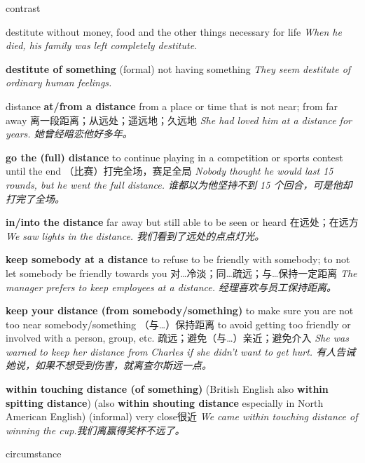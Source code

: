 \begin{DefWord}{contrast}
\end{DefWord}

\begin{DefWord}{destitute}
    without money, food and the other things necessary for life
    \textit{When he died, his family was left completely destitute.}

    \textbf{destitute of something} (formal) not having something
    \textit{They seem destitute of ordinary human feelings.}
\end{DefWord}

\begin{DefWord}{distance}
\textbf{at/from a distance}
from a place or time that is not near; from far away 离一段距离；从远处；遥远地；久远地
\textit{She had loved him at a distance for years. 她曾经暗恋他好多年。}

\textbf{go the (full) distance}
to continue playing in a competition or sports contest until the end （比赛）打完全场，赛足全局
\textit{Nobody thought he would last 15 rounds, but he went the full distance. 谁都以为他坚持不到 15 个回合，可是他却打完了全场。}

\textbf{in/into the distance}
far away but still able to be seen or heard 在远处；在远方
\textit{We saw lights in the distance. 我们看到了远处的点点灯光。}

\textbf{keep somebody at a distance}
to refuse to be friendly with somebody; to not let somebody be friendly towards you 对…冷淡；同…疏远；与…保持一定距离
\textit{The manager prefers to keep employees at a distance. 经理喜欢与员工保持距离。}

\textbf{keep your distance (from somebody/something)}
to make sure you are not too near somebody/something （与…）保持距离
to avoid getting too friendly or involved with a person, group, etc. 疏远；避免（与…）亲近；避免介入
\textit{She was warned to keep her distance from Charles if she didn't want to get hurt. 有人告诫她说，如果不想受到伤害，就离查尔斯远一点。}

\textbf{within touching distance (of something)}
(British English also \textbf{within spitting distance})
(also \textbf{within shouting distance} especially in North American English)
(informal) very close很近
\textit{We came within touching distance of winning the cup.我们离赢得奖杯不远了。}
\end{DefWord}

\begin{DefWord}{circumstance}
\end{DefWord}

